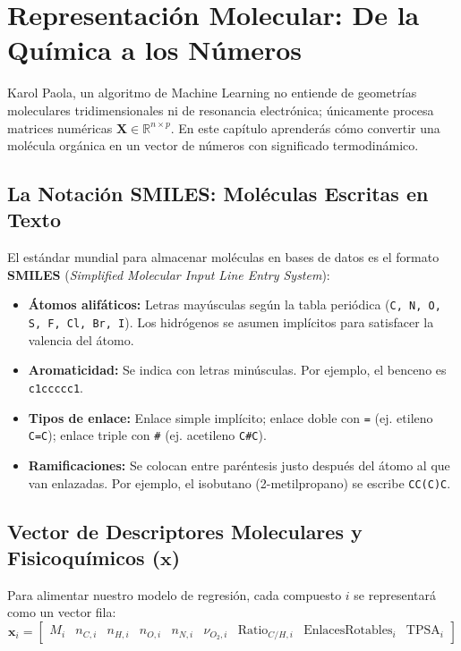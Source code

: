 \documentclass[11pt,letterpaper]{report}
\begin{document}
\newpage

\chapter{Representación Molecular: De la Química a los Números}

Karol Paola, un algoritmo de Machine Learning no entiende de geometrías moleculares tridimensionales ni de resonancia electrónica; únicamente procesa matrices numéricas $\mathbf{X} \in \mathbb{R}^{n \times p}$. En este capítulo aprenderás cómo convertir una molécula orgánica en un vector de números con significado termodinámico.

\section{La Notación SMILES: Moléculas Escritas en Texto}
El estándar mundial para almacenar moléculas en bases de datos es el formato \textbf{SMILES} (\textit{Simplified Molecular Input Line Entry System}):
\begin{itemize}[leftmargin=*]
    \item \textbf{Átomos alifáticos:} Letras mayúsculas según la tabla periódica (\texttt{C, N, O, S, F, Cl, Br, I}). Los hidrógenos se asumen implícitos para satisfacer la valencia del átomo.
    \item \textbf{Aromaticidad:} Se indica con letras minúsculas. Por ejemplo, el benceno es \texttt{c1ccccc1}.
    \item \textbf{Tipos de enlace:} Enlace simple implícito; enlace doble con \texttt{=} (ej. etileno \texttt{C=C}); enlace triple con \texttt{\#} (ej. acetileno \texttt{C\#C}).
    \item \textbf{Ramificaciones:} Se colocan entre paréntesis justo después del átomo al que van enlazadas. Por ejemplo, el isobutano (2-metilpropano) se escribe \texttt{CC(C)C}.
\end{itemize}

\section{Vector de Descriptores Moleculares y Fisicoquímicos ($\mathbf{x}$)}

Para alimentar nuestro modelo de regresión, cada compuesto $i$ se representará como un vector fila:
\begin{equation}
    \mathbf{x}_i = \begin{bmatrix} M_i & n_{C,i} & n_{H,i} & n_{O,i} & n_{N,i} & \nu_{O_2,i} & \text{Ratio}_{C/H,i} & \text{EnlacesRotables}_i & \text{TPSA}_i \end{bmatrix}
\end{equation}
\end{document}
